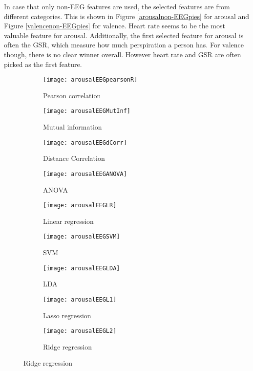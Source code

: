 \npar

In case that only non-EEG features are used, the selected features are from different categories. This is shown in Figure \ref{arousalnon-EEGpies} for arousal and Figure \ref{valencenon-EEGpies} for valence. Heart rate seems to be the most valuable feature for arousal. Additionally, the first selected feature for arousal is often the GSR, which measure how much perspiration a person has.
For valence though, there is no clear winner overall. However heart rate and GSR are often picked as the first feature.

\clearpage
\begin{figure}[!tbp]
  \centering
  \caption{Selection features for arousal classification, using only EEG features.\label{arousalEEGpies}}
  \begin{subfigure}[b]{0.3\textwidth}
    \texttt{[image: arousalEEGpearsonR]}
    \caption{Pearson correlation}
  \end{subfigure}
  \hfill
  \begin{subfigure}[b]{0.3\textwidth}
    \texttt{[image: arousalEEGMutInf]}
    \caption{Mutual information}
  \end{subfigure}
  \hfill
  \begin{subfigure}[b]{0.3\textwidth}
    \texttt{[image: arousalEEGdCorr]}
    \caption{Distance Correlation}
  \end{subfigure}
  
  \begin{subfigure}[b]{0.3\textwidth}
    \texttt{[image: arousalEEGANOVA]}
    \caption{ANOVA}
  \end{subfigure}
  \hfill
  \begin{subfigure}[b]{0.3\textwidth}
    \texttt{[image: arousalEEGLR]}
    \caption{Linear regression}
  \end{subfigure}
  \hfill
  \begin{subfigure}[b]{0.3\textwidth}
    \texttt{[image: arousalEEGSVM]}
    \caption{SVM}
  \end{subfigure}
  
  \begin{subfigure}[b]{0.3\textwidth}
    \texttt{[image: arousalEEGLDA]}
    \caption{LDA}
  \end{subfigure}
  \hfill
  \begin{subfigure}[b]{0.3\textwidth}
    \texttt{[image: arousalEEGL1]}
    \caption{Lasso regression}
  \end{subfigure}
  \hfill
  \begin{subfigure}[b]{0.3\textwidth}
    \texttt{[image: arousalEEGL2]}
    \caption{Ridge regression}
  \end{subfigure}
  

\end{figure}
